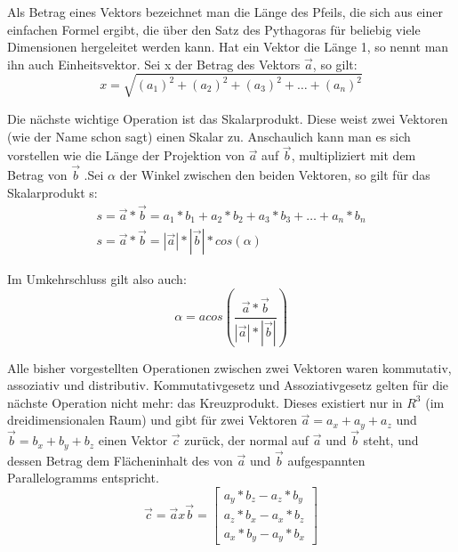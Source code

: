 Als Betrag eines Vektors bezeichnet man die Länge des Pfeils, die sich aus einer einfachen Formel ergibt, die über den Satz des Pythagoras für beliebig viele Dimensionen hergeleitet werden kann. Hat ein Vektor die Länge 1, so nennt man ihn auch Einheitsvektor. Sei x der Betrag des Vektors $\vec{a}$, so gilt:
\begin{equation}\label{veclength}
x = \sqrt{(a_1)^2+(a_2)^2+(a_3)^2+\dots{}+(a_n)^2}
\end{equation}

Die nächste wichtige Operation ist das Skalarprodukt. Diese weist zwei Vektoren (wie der Name schon sagt) einen Skalar zu. Anschaulich kann man es sich vorstellen wie die Länge der Projektion von $\vec{a}$ auf $\vec{b}$, multipliziert mit dem Betrag von $\vec{b}$ .Sei $\alpha$ der Winkel zwischen den beiden Vektoren, so gilt für das Skalarprodukt s:
\begin{gather}\label{vecdot}
s = \vec{a} * \vec{b} = a_1*b_1 + a_2*b_2 + a_3*b_3+\dots{}+a_n*b_n\\
s = \vec{a} * \vec{b} = |\vec{a}| * |\vec{b}| * cos(\alpha)
\end{gather}

Im Umkehrschluss gilt also auch:
\begin{equation}\label{vecdot2}
\alpha=acos(\frac{\vec{a}*\vec{b}}{|\vec{a}|*|\vec{b}|})
\end{equation}

Alle bisher vorgestellten Operationen zwischen zwei Vektoren waren kommutativ, assoziativ und distributiv. Kommutativgesetz und Assoziativgesetz gelten für die nächste Operation nicht mehr: das Kreuzprodukt. Dieses existiert nur in $R^3$ (im dreidimensionalen Raum) und gibt für zwei Vektoren $\vec{a}=a_x+a_y+a_z$ und $\vec{b}=b_x+b_y+b_z$ einen Vektor $\vec{c}$ zurück, der normal auf $\vec{a}$ und $\vec{b}$ steht, und dessen Betrag dem Flächeninhalt des von $\vec{a}$ und $\vec{b}$ aufgespannten Parallelogramms entspricht.
\begin{equation}\label{veccross}
\vec{c} = \vec{a}x\vec{b} = 
\begin{bmatrix} a_y*b_z - a_z*b_y \\ a_z*b_x - a_x*b_z \\ a_x*b_y - a_y*b_x \end{bmatrix}
\end{equation}

